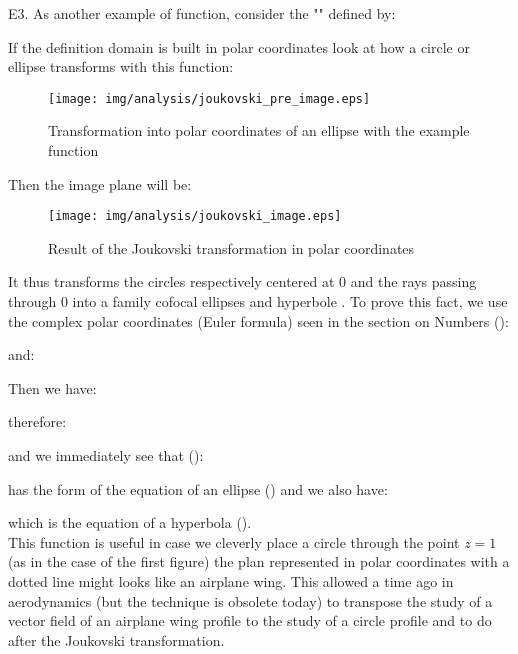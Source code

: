 \pagebreak
	\begin{tcolorbox}[colframe=black,colback=white,sharp corners]
	E3. As another example of function, consider the "" defined by:
	
If the definition domain is built in polar coordinates look at how a circle or ellipse transforms with this function:

	\begin{figure}[H]
		\begin{center}
			\texttt{[image: img/analysis/joukovski\_pre\_image.eps]}
		\end{center}	
		\caption{Transformation into polar coordinates of an ellipse with the example function}
	\end{figure}
Then the image plane will be:
	\begin{figure}[H]
		\begin{center}
			\texttt{[image: img/analysis/joukovski\_image.eps]}
		\end{center}	
		\caption{Result of the Joukovski transformation in polar coordinates}
	\end{figure}
It thus transforms the circles respectively centered at $0$ and the rays passing through $0$ into a family cofocal ellipses and hyperbole . To prove this fact, we use the complex polar coordinates (Euler formula) seen in the section on Numbers ():
	\end{tcolorbox}

	\begin{tcolorbox}[colframe=black,colback=white,sharp corners]
	
and:
	
Then we have:
	
therefore:
	
and we immediately see that ():
	
has the form of the equation of an ellipse () and we also have:
	
	which is the equation of a hyperbola ().\\

	This function is useful in case we cleverly place a circle through the point $z=1$ (as in the case of the first figure) the plan represented in polar coordinates with a dotted line might looks like an airplane wing. This allowed a time ago in aerodynamics (but the technique is obsolete today)  to transpose the study of a vector field of an airplane wing profile to the study of a circle profile and to do after the Joukovski transformation.
	\end{tcolorbox}
	
